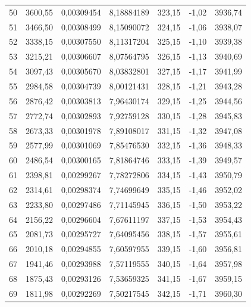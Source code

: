 \documentclass[12pt,a4paper,final,twoside,fleqn]{article}
\begin{document}
\begin{ThreePartTable}
\begin{longtable}{rrrrrrr}
50           & 3600,55   & 0,00309454    & 8,18884189  & 323,15     & -1,02      & 3936,74 \\
51           & 3466,50   & 0,00308499    & 8,15090072  & 324,15     & -1,06      & 3938,07 \\
52           & 3338,15   & 0,00307550    & 8,11317204  & 325,15     & -1,10      & 3939,38 \\
53           & 3215,21   & 0,00306607    & 8,07564795  & 326,15     & -1,13      & 3940,69 \\
54           & 3097,43   & 0,00305670    & 8,03832801  & 327,15     & -1,17      & 3941,99 \\
55           & 2984,58   & 0,00304739    & 8,00121431  & 328,15     & -1,21      & 3943,28 \\
56           & 2876,42   & 0,00303813    & 7,96430174  & 329,15     & -1,25      & 3944,56 \\
57           & 2772,74   & 0,00302893    & 7,92759128  & 330,15     & -1,28      & 3945,83 \\
58           & 2673,33   & 0,00301978    & 7,89108017  & 331,15     & -1,32      & 3947,08 \\
59           & 2577,99   & 0,00301069    & 7,85476530  & 332,15     & -1,36      & 3948,33 \\
60           & 2486,54   & 0,00300165    & 7,81864746  & 333,15     & -1,39      & 3949,57 \\
61           & 2398,81   & 0,00299267    & 7,78272806  & 334,15     & -1,43      & 3950,79 \\
62           & 2314,61   & 0,00298374    & 7,74699649  & 335,15     & -1,46      & 3952,02 \\
63           & 2233,80   & 0,00297486    & 7,71145945  & 336,15     & -1,50      & 3953,22 \\
64           & 2156,22   & 0,00296604    & 7,67611197  & 337,15     & -1,53      & 3954,43 \\
65           & 2081,73   & 0,00295727    & 7,64095456  & 338,15     & -1,57      & 3955,61 \\
66           & 2010,18   & 0,00294855    & 7,60597955  & 339,15     & -1,60      & 3956,81 \\
67           & 1941,46   & 0,00293988    & 7,57119555  & 340,15     & -1,64      & 3957,98 \\
68           & 1875,43   & 0,00293126    & 7,53659325  & 341,15     & -1,67      & 3959,15 \\
69           & 1811,98   & 0,00292269    & 7,50217545  & 342,15     & -1,71      & 3960,30 \\

\end{longtable}
\end{ThreePartTable}
\end{document}

